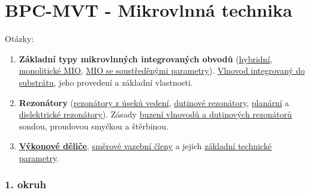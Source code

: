\part{BPC-MVT - Mikrovlnná technika}

{\huge Otázky:}

\begin{enumerate}
	\item \textbf{Základní typy mikrovlnných integrovaných obvodů} (\hyperref[tema:HMIO]{hybridní}, \hyperref[tema:MMIO]{monolitické MIO}, \hyperref[tema:MIO_sus_param]{MIO se soustředěnými parametry}). \hyperref[tema:SIW]{Vlnovod integrovaný do substrátu}, jeho provedení a základní vlastnosti.
	
	\item \textbf{Rezonátory} (\hyperref[rez:usek_vedeni]{rezonátory z úseků vedení}, \hyperref[rez:dutinove_rez]{dutinové rezonátory}, \hyperref[rez:planar_rezon]{planární} a \hyperref[rez:dielec_rezon]{dielektrické rezonátory}). Zásady \hyperref[budenie:vlnovod:dutin]{buzení vlnovodů a dutinových rezonátorů} sondou, proudovou smyčkou a štěrbinou.
	
	\item \hyperref[delice]{\textbf{Výkonové děliče}}, \hyperref[odbnocnice]{směrové vazební členy} a jejich \hyperref[odbnocnice_param]{základní technické parametry}.
\end{enumerate}

\newpage

\section{1. okruh}
